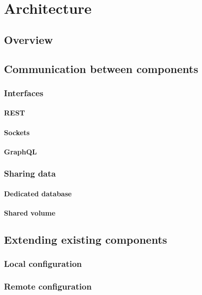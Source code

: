 \chapter{Architecture}
\section{Overview}
\section{Communication between components}
\subsection{Interfaces}
\subsubsection{REST}
\subsubsection{Sockets}
\subsubsection{GraphQL}
\subsection{Sharing data}
\subsubsection{Dedicated database}
\subsubsection{Shared volume}
\section{Extending existing components}
\subsection{Local configuration}
\subsection{Remote configuration}

